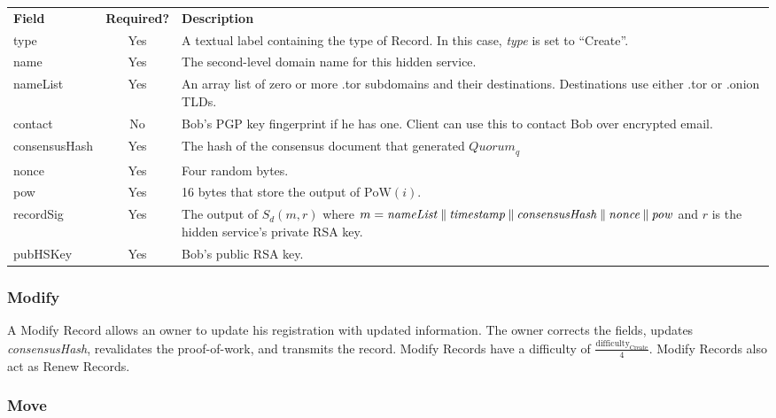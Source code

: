 \renewcommand{\arraystretch}{1.75} %
\begin{center}
    \begin{longtabu}{ | l | c | p{9.5cm} |}
    \hline
    \textbf{Field} & \textbf{Required?} & \textbf{Description} \\
    type & Yes & A textual label containing the type of Record. In this case, \emph{type} is set to ``Create''. \\
    name & Yes & The second-level domain name for this hidden service. \\
    nameList & Yes & An array list of zero or more .tor subdomains and their destinations. Destinations use either .tor or .onion TLDs. \\
    contact & No & Bob's PGP key fingerprint if he has one. Client can use this to contact Bob over encrypted email. \\
    consensusHash & Yes & The hash of the consensus document that generated $ \mathit{Quorum}_{q} $ \\
    nonce & Yes & Four random bytes. \\
   	pow & Yes & 16 bytes that store the output of $ \mathrm{PoW}(i) $. \\
   	recordSig & Yes & The output of $ S_{d}(m, r) $ where $ m = \mathit{nameList} \mathbin{\|} \mathit{timestamp} \mathbin{\|} \mathit{consensusHash} \mathbin{\|} \mathit{nonce} \mathbin{\|} \mathit{pow} $ and $ r $ is the hidden service's private RSA key. \\
   	pubHSKey & Yes & Bob's public RSA key. \\
    \hline
    \end{longtabu}
\end{center}

\subsubsection{Modify}

A Modify Record allows an owner to update his registration with updated information. The owner corrects the fields, updates \emph{consensusHash}, revalidates the proof-of-work, and transmits the record. Modify Records have a difficulty of $ \frac{\textrm{difficulty}_{\textrm{Create}}}{4} $. Modify Records also act as Renew Records. 

\subsubsection{Move}

